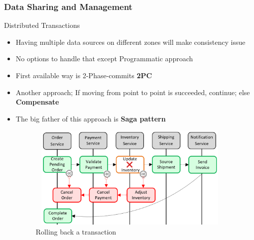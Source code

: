 \documentclass{beamer}
\begin{document}
	\begin{frame}
		\frametitle{Data Sharing and Management}
		Distributed Transactions \\
		\vspace{1mm}
		\begin{itemize}
			\item<1-> \scriptsize{Having multiple data sources on different zones will make consistency issue}
			\item<1-> \scriptsize{No options to handle that except Programmatic approach}
			\item<1-> \scriptsize{First available way is 2-Phase-commits \textbf{2PC}}
			\item<2-> \scriptsize{Another approach; If moving from point to point is succeeded, continue; else \textbf{Compensate}}
			\item<3-> \scriptsize{The big father of this approach is \textbf{Saga pattern}}
				\begin{figure}[h]
					\includegraphics[width=100mm,height= 50mm, scale=1]{img/saga-rollback.png}
					\caption{Rolling back a transaction}
				\end{figure}
		\end{itemize}
	\end{frame}
	
\end{document}

